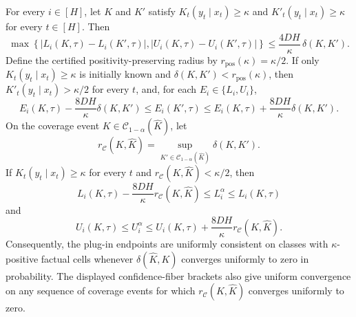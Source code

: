 For every \(i\in[H]\), let \(K\) and \(K'\) satisfy \(K_t(y_t\mid x_t)\ge\kappa\) and \(K'_t(y_t\mid x_t)\ge\kappa\) for every \(t\in[H]\). Then
\[
 \max\!\left\{|L_i(K,\tau)-L_i(K',\tau)|,
                 |U_i(K,\tau)-U_i(K',\tau)|\right\}
 \le \frac{4DH}{\kappa}\,\delta(K,K').
\]
Define the certified positivity-preserving radius by \(r_{\mathrm{pos}}(\kappa)=\kappa/2\). If only \(K_t(y_t\mid x_t)\ge\kappa\) is initially known and \(\delta(K,K')<r_{\mathrm{pos}}(\kappa)\), then \(K'_t(y_t\mid x_t)>\kappa/2\) for every \(t\), and, for each \(E_i\in\{L_i,U_i\}\),
\[
 E_i(K,\tau)-\frac{8DH}{\kappa}\delta(K,K')
 \le E_i(K',\tau)
 \le E_i(K,\tau)+\frac{8DH}{\kappa}\delta(K,K').
\]
On the coverage event \(K\in\mathcal C_{1-\alpha}(\widehat K)\), let
\[
 r_{\mathcal C}(K,\widehat K)
 =\sup_{K'\in\mathcal C_{1-\alpha}(\widehat K)}\delta(K,K').
\]
If \(K_t(y_t\mid x_t)\ge\kappa\) for every \(t\) and \(r_{\mathcal C}(K,\widehat K)<\kappa/2\), then
\[
 L_i(K,\tau)-\frac{8DH}{\kappa}r_{\mathcal C}(K,\widehat K)
 \le L_i^{\alpha}\le L_i(K,\tau)
\]
and
\[
 U_i(K,\tau)
 \le U_i^{\alpha}
 \le U_i(K,\tau)+\frac{8DH}{\kappa}r_{\mathcal C}(K,\widehat K).
\]
Consequently, the plug-in endpoints are uniformly consistent on classes with \(\kappa\)-positive factual cells whenever \(\delta(\widehat K,K)\) converges uniformly to zero in probability. The displayed confidence-fiber brackets also give uniform convergence on any sequence of coverage events for which \(r_{\mathcal C}(K,\widehat K)\) converges uniformly to zero.